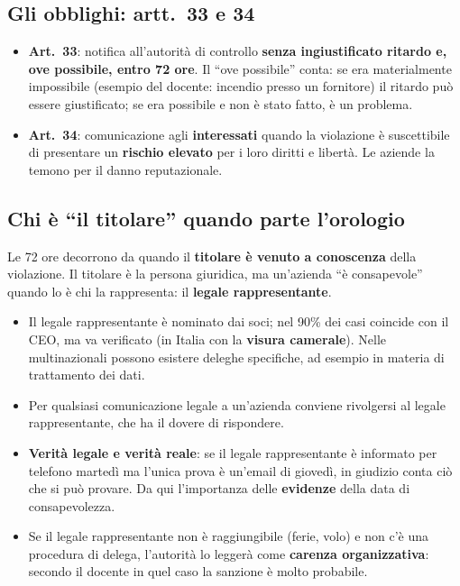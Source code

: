 \subsection{Gli obblighi: artt.~33 e 34}
\begin{itemize}
  \item \textbf{Art.~33}: notifica all'autorità di controllo \textbf{senza ingiustificato ritardo e,
    ove possibile, entro 72 ore}. Il ``ove possibile'' conta: se era materialmente impossibile (esempio
    del docente: incendio presso un fornitore) il ritardo può essere giustificato; se era possibile e
    non è stato fatto, è un problema.
  \item \textbf{Art.~34}: comunicazione agli \textbf{interessati} quando la violazione è suscettibile
    di presentare un \textbf{rischio elevato} per i loro diritti e libertà. Le aziende la temono per
    il danno reputazionale.
\end{itemize}

\subsection{Chi è ``il titolare'' quando parte l'orologio}
Le 72 ore decorrono da quando il \textbf{titolare è venuto a conoscenza} della violazione. Il titolare
è la persona giuridica, ma un'azienda ``è consapevole'' quando lo è chi la rappresenta: il
\textbf{legale rappresentante}.
\begin{itemize}
  \item Il legale rappresentante è nominato dai soci; nel 90\% dei casi coincide con il CEO, ma va
    verificato (in Italia con la \textbf{visura camerale}). Nelle multinazionali possono esistere
    deleghe specifiche, ad esempio in materia di trattamento dei dati.
  \item Per qualsiasi comunicazione legale a un'azienda conviene rivolgersi al legale
    rappresentante, che ha il dovere di rispondere.
  \item \textbf{Verità legale e verità reale}: se il legale rappresentante è informato per telefono
    martedì ma l'unica prova è un'email di giovedì, in giudizio conta ciò che si può provare.
    Da qui l'importanza delle \textbf{evidenze} della data di consapevolezza.
  \item Se il legale rappresentante non è raggiungibile (ferie, volo) e non c'è una procedura di
    delega, l'autorità lo leggerà come \textbf{carenza organizzativa}: secondo il docente in quel caso
    la sanzione è molto probabile.
\end{itemize}

